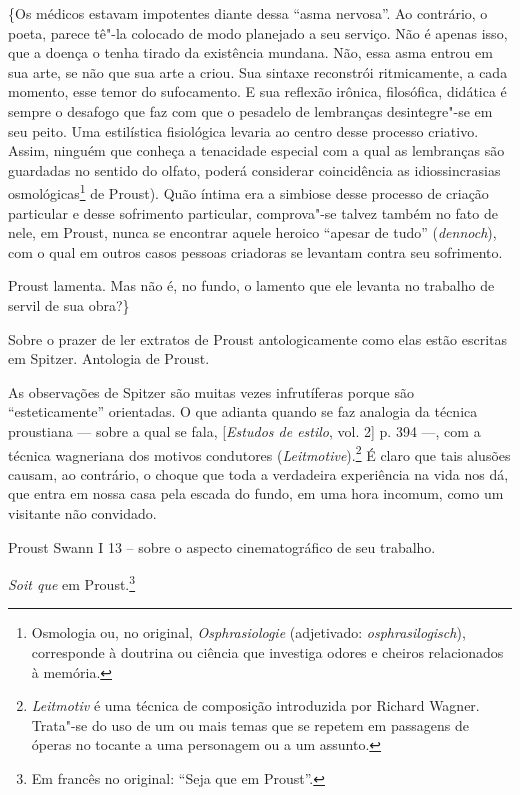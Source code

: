 \{Os médicos estavam impotentes diante dessa ``asma nervosa''. Ao
contrário, o poeta, parece tê"-la colocado de modo planejado a seu
serviço. Não é apenas isso, que a doença o tenha tirado da existência
mundana. Não, essa asma entrou em sua arte, se não que sua arte a criou.
Sua sintaxe reconstrói ritmicamente, a cada momento, esse temor do
sufocamento. E sua reflexão irônica, filosófica, didática é sempre o
desafogo que faz com que o pesadelo de lembranças desintegre"-se em seu
peito. Uma estilística fisiológica levaria ao centro desse processo
criativo. Assim, ninguém que conheça a tenacidade especial com a qual as
lembranças são guardadas no sentido do olfato, poderá considerar
coincidência as idiossincrasias osmológicas\footnote{Osmologia ou,
  no original, \emph{Osphrasiologie} (adjetivado:
  \emph{osphrasilogisch}), corresponde à doutrina ou ciência que
  investiga odores e cheiros relacionados à memória. \versal{[N. E.]}} de Proust). Quão
íntima era a simbiose desse processo de criação particular e desse
sofrimento particular, comprova"-se talvez também no fato de nele, em
Proust, nunca se encontrar aquele heroico ``apesar de tudo''
(\emph{dennoch}), com o qual em outros casos pessoas criadoras se
levantam contra seu sofrimento.

Proust lamenta. Mas não é, no fundo, o lamento que ele levanta no
trabalho de servil de sua obra?\}

Sobre o prazer de ler extratos de Proust antologicamente como elas estão
escritas em Spitzer. Antologia de Proust.

As observações de Spitzer são muitas vezes infrutíferas porque são
``esteticamente'' orientadas. O que adianta quando se faz analogia da
técnica proustiana --- sobre a qual se fala, {[}\emph{Estudos de estilo},
vol. 2{]} p. 394 ---, com a técnica wagneriana dos motivos condutores
(\emph{Leitmotive}).\footnote{\emph{Leitmotiv} é uma técnica de
  composição introduzida por Richard Wagner. Trata"-se do uso de um ou
  mais temas que se repetem em passagens de óperas no tocante a uma
  personagem ou a um assunto. \versal{[N. E.]}} É claro que tais alusões causam, ao
contrário, o choque que toda a verdadeira experiência na vida nos dá,
que entra em nossa casa pela escada do fundo, em uma hora incomum, como
um visitante não convidado.

Proust Swann I 13 -- sobre o aspecto cinematográfico de seu trabalho.

\emph{Soit que} em Proust.\footnote{Em francês no original: ``Seja
  que em Proust''. \versal{[N. T.]}}

